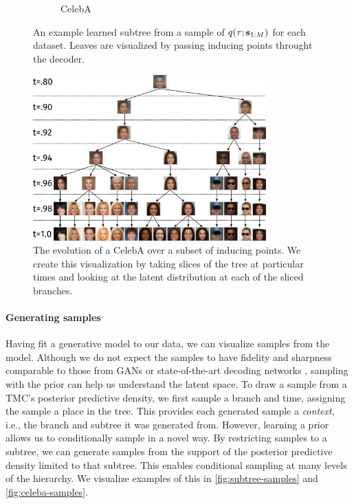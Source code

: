 \begin{figure}[t]
\begin{subfigure}[t]{0.3\textwidth}
\caption{CelebA}
\end{subfigure}
\caption{An example learned subtree from a sample of $q(\tau; \mathbf{s}_{1:M})$ for each dataset. 
Leaves are visualized by passing inducing points throught the decoder.}
\label{fig:subtrees}
\end{figure}
\begin{figure}[t]
\centering
\includegraphics[width=0.8\textwidth]{img/loracs/celeba/celeba-evolution.png}
\caption{The evolution of a CelebA over a subset of inducing points. We create
this visualization by taking slices of the tree at particular times
and looking at the latent distribution 
at each of the sliced branches.}
\label{fig:celeba-evolution}
\end{figure}

\paragraph{Generating samples} 
Having fit a generative model to our data,
we can visualize samples from the model.
Although we do not expect the samples
to have fidelity and sharpness comparable
to those from GANs or state-of-the-art
decoding networks \citep{Radford2015, Salimans2017},
sampling with the
\acronym\;prior can help us understand the latent space.
To draw a sample from a TMC's posterior predictive density,
we first sample a branch and time, assigning
the sample a place in the tree.
This provides each generated sample a \emph{context},
i.e., the branch and subtree it was generated from.
However, learning a \acronym\;prior allows us to
conditionally sample in a novel way. By restricting
samples to a subtree, we can generate samples
from the support of the posterior predictive density
limited to that subtree. This enables
conditional sampling at many levels of
the hierarchy. We visualize examples
of this in \autoref{fig:subtree-samples}
and \autoref{fig:celeba-samples}.


